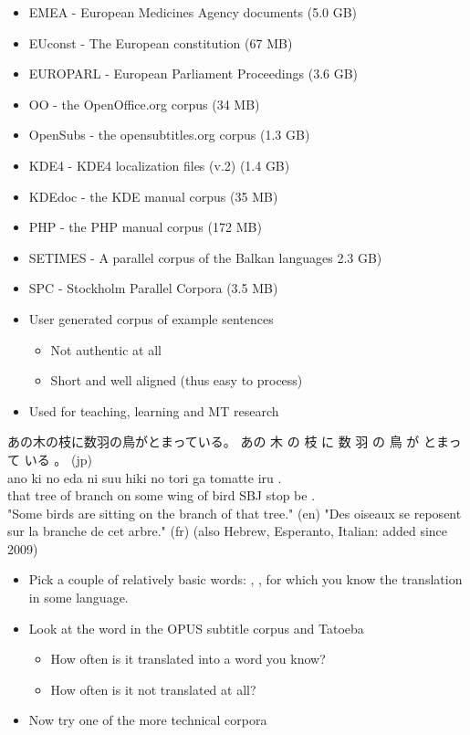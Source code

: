 \documentclass[a4paper,landscape,headrule,footrule,dvips]{foils}
\begin{document}
\begin{CJK}{UTF8}{min}
\begin{itemize} \addtolength{\itemsep}{-1ex}
\item EMEA - European Medicines Agency documents (5.0 GB)
\item EUconst - The European constitution (67 MB)
\item EUROPARL - European Parliament Proceedings (3.6 GB)
\item OO - the OpenOffice.org corpus (34 MB)
\item OpenSubs - the opensubtitles.org corpus (1.3 GB)
\item KDE4 - KDE4 localization files (v.2) (1.4 GB)
\item KDEdoc - the KDE manual corpus (35 MB)
\item PHP - the PHP manual corpus (172 MB)
\item SETIMES - A parallel corpus of the Balkan languages 2.3 GB)
\item SPC - Stockholm Parallel Corpora (3.5 MB)
\end{itemize}



\begin{itemize}
\item User generated corpus of example sentences
  \begin{itemize}
  \item Not authentic at all
  \item Short and well aligned (thus easy to process)
  \end{itemize}
\item Used for teaching, learning and MT research 
\end{itemize}

\begin{exe} \small
\ex \label{7836}
あの木の枝に数羽の鳥がとまっている。
\glll あの 木 の 枝 に 数 羽 の 鳥 が とまって いる 。 (jp)\\
 ano ki no eda ni suu hiki no tori ga tomatte iru . \\
 that tree of branch on some wing of bird SBJ stop be . \\
\trans "Some birds are sitting on the branch of that tree." (en)
\trans "Des oiseaux se reposent sur la branche de cet arbre." (fr)
\trans (also Hebrew, Esperanto, Italian: added since 2009)
\end{exe}

\begin{itemize}
\item Pick a couple of relatively basic words: , , 
  for which you know the translation in some language.
\item Look at the word in the OPUS subtitle corpus and Tatoeba
  \begin{itemize}
  \item How often is it translated into a word you know?
  \item How often is it not translated at all?
  \end{itemize}
\item Now try one of the more technical corpora


\end{itemize}
\end{CJK}
\end{document}
